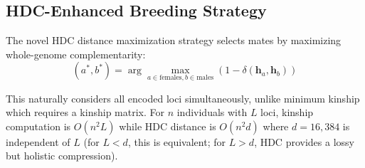 \documentclass[11pt,letterpaper]{article}
\newcommand{\hv}{\mathbf{h}}
\newcommand{\similar}{\delta}
\newcommand{\dimHDC}{16{,}384}
\begin{document}
\subsection{HDC-Enhanced Breeding Strategy}

The novel HDC distance maximization strategy selects mates by maximizing
whole-genome complementarity:
\begin{equation}
(a^*, b^*) = \arg\max_{a \in \text{females}, b \in \text{males}} \left(1 - \similar(\hv_a, \hv_b)\right)
\label{eq:hdc_breeding}
\end{equation}

This naturally considers all encoded loci simultaneously, unlike minimum kinship
which requires a kinship matrix. For $n$ individuals with $L$ loci, kinship
computation is $O(n^2 L)$ while HDC distance is $O(n^2 d)$ where $d = \dimHDC$
is independent of $L$ (for $L < d$, this is equivalent; for $L > d$, HDC
provides a lossy but holistic compression).
\end{document}
